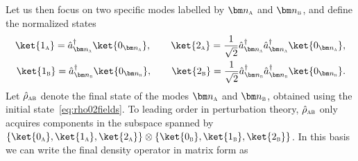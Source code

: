 \documentclass[letterpaper,12pt,titlepage,oneside,final]{book}
\newcommand{\tc}[1]{\textsc{#1}}
\begin{document}
    Let us then focus on two specific modes labelled by $\bm n_\tc{a}$ and $\bm n_\tc{b}$, and define the normalized states
    \begin{align}
        \ket{1_\tc{a}} = \hat{a}_{\bm n_\tc{a}}^\dagger \ket{0_{\bm n_\tc{a}}}, \quad\quad 
        \ket{2_\tc{a}} = \frac{1}{\sqrt{2}}\hat{a}_{\bm n_\tc{a}}^\dagger\hat{a}_{\bm n_\tc{a}}^\dagger \ket{0_{\bm n_\tc{a}}},\\
        \ket{1_\tc{b}} = \hat{a}_{\bm n_\tc{b}}^\dagger \ket{0_{\bm n_\tc{b}}}, \quad\quad 
        \ket{2_\tc{b}} = \frac{1}{\sqrt{2}}\hat{a}_{\bm n_\tc{b}}^\dagger\hat{a}_{\bm n_\tc{b}}^\dagger \ket{0_{\bm n_\tc{b}}}.
    \end{align}
    Let $\hat{\rho}_\tc{ab}$ denote the final state of the modes $\bm n_\tc{a}$ and $\bm n_\tc{b}$, obtained using the initial state~\eqref{eq:rho02fields}. To leading order in perturbation theory, $\hat{\rho}_\tc{ab}$ only acquires components in the subspace spanned by $\{\ket{0_\tc{a}},\ket{1_\tc{a}},\ket{2_\tc{a}}\}\otimes\{\ket{0_\tc{b}},\ket{1_\tc{b}},\ket{2_\tc{b}}\}$. In this basis we can write the final density operator in matrix form as
    

    
    
\end{document}

